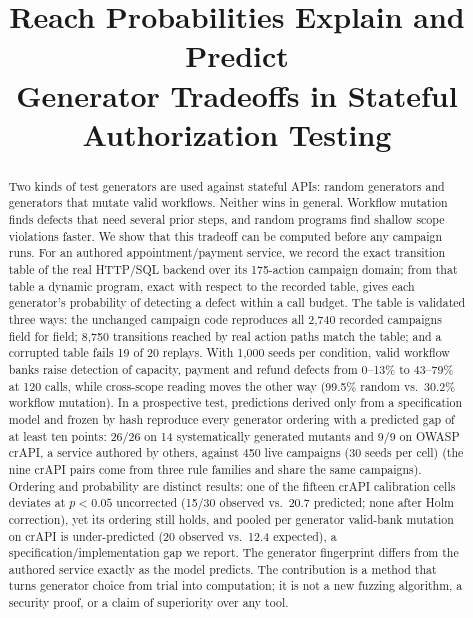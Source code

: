 \documentclass[conference]{IEEEtran}
\begin{document}
\title{Reach Probabilities Explain and Predict\\
Generator Tradeoffs in Stateful Authorization Testing}

\author{
}

\maketitle

\begin{abstract}
Two kinds of test generators are used against stateful APIs: random generators and
generators that mutate valid workflows. Neither wins in general. Workflow mutation finds
defects that need several prior steps, and random programs find shallow scope violations
faster. We show that this tradeoff can be computed before any campaign runs. For an
authored appointment/payment service, we record the exact transition table of the real
HTTP/SQL backend over its 175-action campaign domain; from that table a dynamic
program, exact with respect to the recorded table, gives each generator's probability of detecting a defect within a call budget.
The table is validated three ways: the unchanged campaign code reproduces all 2{,}740
recorded campaigns field for field; 8{,}750 transitions reached by real action paths
match the table; and a corrupted table fails 19 of 20 replays. With 1{,}000 seeds per
condition, valid workflow banks raise detection of capacity, payment and refund defects
from 0--13\% to 43--79\% at 120 calls, while cross-scope reading moves the other way
(99.5\% random vs.\ 30.2\% workflow mutation). In a prospective test, predictions derived
only from a specification model and frozen by hash reproduce every generator ordering with
a predicted gap of at least ten points: 26/26 on 14 systematically generated mutants and
9/9 on OWASP crAPI, a service authored by others, against 450 live campaigns (30 seeds per cell) (the nine
crAPI pairs come from three rule families and share the same campaigns). Ordering and
probability are distinct results: one of the fifteen crAPI calibration cells deviates at
$p<0.05$ uncorrected (15/30 observed vs.\ 20.7 predicted; none after Holm correction), yet
its ordering still holds, and pooled per generator valid-bank mutation on crAPI is
under-predicted (20 observed vs.\ 12.4 expected), a specification/implementation gap we
report.
The generator fingerprint differs from the authored service exactly as the model predicts. The contribution is a method that
turns generator choice from trial into computation; it is not a new fuzzing algorithm, a
security proof, or a claim of superiority over any tool.
\end{abstract}
\end{document}
